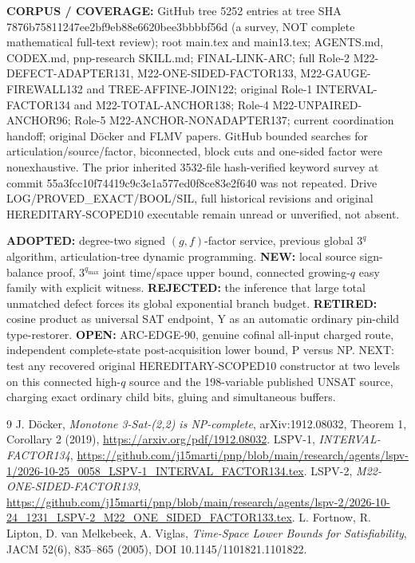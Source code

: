 \documentclass[11pt]{article}
\begin{document}
\textbf{CORPUS / COVERAGE:} GitHub tree 5252 entries at tree SHA 7876b75811247ee2bf9eb88e6620bee3bbbbf56d (a survey, NOT complete mathematical full-text review); root main.tex and main13.tex; AGENTS.md, CODEX.md, pnp-research SKILL.md; FINAL-LINK-ARC; full Role-2 M22-DEFECT-ADAPTER131, M22-ONE-SIDED-FACTOR133, M22-GAUGE-FIREWALL132 and TREE-AFFINE-JOIN122; original Role-1 INTERVAL-FACTOR134 and M22-TOTAL-ANCHOR138; Role-4 M22-UNPAIRED-ANCHOR96; Role-5 M22-ANCHOR-NONADAPTER137; current coordination handoff; original D\"ocker and FLMV papers. GitHub bounded searches for articulation/source/factor, biconnected, block cuts and one-sided factor were nonexhaustive. The prior inherited 3532-file hash-verified keyword survey at commit 55a3fcc10f74419c9c3e1a577ed0f8ce83e2f640 was not repeated. Drive LOG/PROVED\_EXACT/BOOL/SIL, full historical revisions and original HEREDITARY-SCOPED10 executable remain unread or unverified, not absent.

\textbf{ADOPTED:} degree-two signed $(g,f)$-factor service, previous global $3^q$ algorithm, articulation-tree dynamic programming. \textbf{NEW:} local source sign-balance proof, $3^{q_{\max}}$ joint time/space upper bound, connected growing-$q$ easy family with explicit witness. \textbf{REJECTED:} the inference that large total unmatched defect forces its global exponential branch budget. \textbf{RETIRED:} cosine product as universal SAT endpoint, Y as an automatic ordinary pin-child type-restorer. \textbf{OPEN:} ARC-EDGE-90, genuine cofinal all-input charged route, independent complete-state post-acquisition lower bound, P versus NP. NEXT: test any recovered original HEREDITARY-SCOPED10 constructor at two levels on this connected high-$q$ source and the 198-variable published UNSAT source, charging exact ordinary child bits, gluing and simultaneous buffers.

\begin{thebibliography}{9}
 J. D\"ocker, \emph{Monotone 3-Sat-(2,2) is NP-complete}, arXiv:1912.08032, Theorem 1, Corollary 2 (2019), \url{https://arxiv.org/pdf/1912.08032}.
 LSPV-1, \emph{INTERVAL-FACTOR134}, \url{https://github.com/j15marti/pnp/blob/main/research/agents/lspv-1/2026-10-25_0058_LSPV-1_INTERVAL_FACTOR134.tex}.
 LSPV-2, \emph{M22-ONE-SIDED-FACTOR133}, \url{https://github.com/j15marti/pnp/blob/main/research/agents/lspv-2/2026-10-24_1231_LSPV-2_M22_ONE_SIDED_FACTOR133.tex}.
 L. Fortnow, R. Lipton, D. van Melkebeek, A. Viglas, \emph{Time-Space Lower Bounds for Satisfiability}, JACM 52(6), 835--865 (2005), DOI 10.1145/1101821.1101822.
\end{thebibliography}
\end{document}
